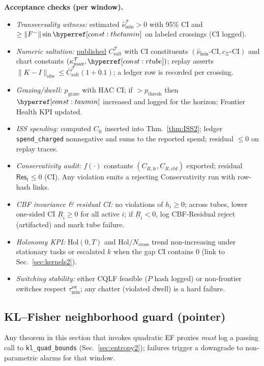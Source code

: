 \begin{mdframed}
\textbf{Acceptance checks (per window).}
\begin{itemize}[leftmargin=*]
\item \emph{Transversality witness:} estimated $\hat\nu_{\min}^\mathcal T>0$ with 95\% CI and $\ge \|F^-\|\sin\constref{thetamin}$ on labeled crossings (CI logged).
\item \emph{Numeric saltation:} \underline{published} $C_{\mathrm{salt}}^\mathcal T$ with CI constituents $(\hat\nu_{\min}\text{-CI},c_\Sigma\text{-CI})$ and chart constants $(\kappa_{\max}^\mathcal T,\constref{rtube})$; replay asserts $\|K-I\|_{\text{obs}}\le \overline C_{\mathrm{salt}}^\mathcal T(1+0.1)$; a ledger row is recorded per crossing.
\item \emph{Grazing/dwell:} $p_{\mathrm{graze}}$ with HAC CI; if $>p_{\mathrm{thresh}}$ then $\constref{taumin}$ increased and logged for the horizon; Frontier Health KPI updated.
\item \emph{ISS spending:} computed $C_{\mathrm{fr}}$ inserted into Thm.~\ref{thm:ISS2}; ledger \texttt{spend\_charged} nonnegative and sums to the reported spend; residual $\le 0$ on replay traces.
\item \emph{Conservativity audit:} $f(\cdot)$ constants $(C_{R,\mathrm{fr}},C_{R,\mathrm{cbf}})$ exported; residual $\mathsf{Res}_t\le 0$ (CI). Any violation emits a rejecting \textsf{Conservativity} run with row-hash links.
\item \emph{CBF invariance \& residual CI:} no violations of $h_i\ge 0$; across tubes, lower one-sided CI $\underline R_i\ge 0$ for all active $i$; if $\underline R_i<0$, log \textsf{CBF-Residual} reject (artifacted) and mark tube failure.
\item \emph{Holonomy KPI:} $\mathrm{Hol}(0,T)$ and $\mathrm{Hol}/N_{\mathrm{cross}}$ trend non-increasing under stationary tasks or escalated $k$ when the gap CI contains $0$ (link to Sec.~\ref{sec:kernels2}).
\item \emph{Switching stability:} either CQLF feasible ($P$ hash logged) or non-frontier switches respect $\tau_{\min}^{\mathrm{sw}}$; any chatter (violated dwell) is a hard failure.
\end{itemize}
\end{mdframed}

\subsection*{KL--Fisher neighborhood guard (pointer)}
Any theorem in this section that invokes quadratic EF proxies \emph{must} log a passing call to \texttt{kl\_quad\_bounds} (Sec.~\ref{sec:entropy2}); failures trigger a downgrade to non-parametric alarms for that window.

